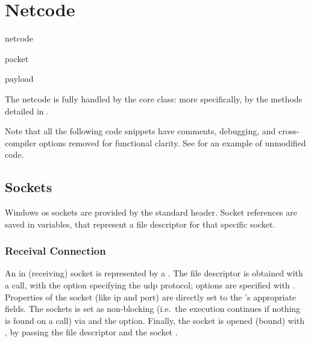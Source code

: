\section{Netcode}\label{sc:middleware:netcode}

\begin{definition}{netcode}
\end{definition}

\begin{definition}{packet}
\end{definition}

\begin{definition}{payload}
\end{definition}

The netcode is fully handled by the core  class: more specifically, by the methods detailed in .



Note that all the following code snippets have comments, debugging, and cross-compiler options removed for functional clarity. See  for an example of unmodified code.

\subsection{ Sockets}

Windows \gls{os} sockets are provided by the standard  header. Socket references are saved in  variables, that represent a file descriptor for that specific socket.

\subsubsection{Receival Connection}

An in (receiving) socket is represented by a . The file descriptor is obtained with a  call, with the  option specifying the \gls{udp} protocol; options are specified with . Properties of the socket (like \gls{ip} and port) are directly set to the 's appropriate fields. The sockets is set as non-blocking (i.e.\ the execution continues if nothing is found on a  call) via  and the  option. Finally, the socket is opened (bound) with , by passing the file descriptor and the socket .

